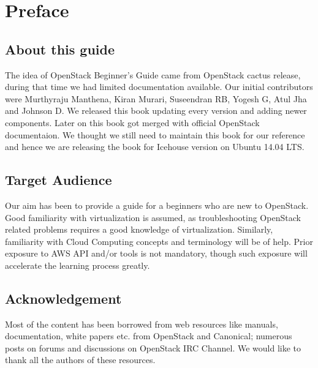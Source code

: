 

%
\chapter{Preface} 

\section*{About this guide}
The idea of OpenStack Beginner's Guide came from OpenStack cactus release, during that time we had limited documentation available. Our initial contributors were Murthyraju Manthena, Kiran Murari, Suseendran RB, Yogesh G, Atul Jha and Johnson D. We released this book updating every version and adding newer components. Later on this book got merged with official OpenStack documentaion. We thought we still need to maintain this book for our reference and hence we are releasing the book for Icehouse version on Ubuntu 14.04 LTS.

\section*{Target Audience}
Our aim has been to provide a guide for a beginners who are new to OpenStack. Good familiarity with virtualization is assumed, as troubleshooting OpenStack related problems requires a good knowledge of virtualization. Similarly, familiarity with Cloud Computing concepts and terminology will be of help. Prior exposure to AWS API and/or tools is not mandatory, though such exposure will accelerate the learning process greatly.

\section*{Acknowledgement}
Most of the content has been borrowed from web resources like manuals, documentation, white papers etc. from OpenStack and Canonical; numerous posts on forums and discussions on OpenStack IRC Channel. We would like to thank all the authors of these resources.

